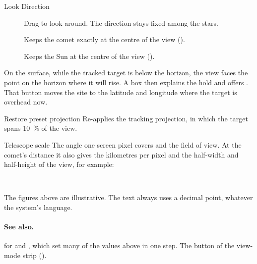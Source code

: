 \begin{uipanel}
\begin{uiproperty}[key=look-direction, id=OrientFree, type={radio buttons},
    range={\uilabel{Free look}, \uilabel{Comet tracking}, \uilabel{Sun tracking}},
    default={\uilabel{Free look}}, effect=camera, saved=file,
    help=Tabs_Settings_HelpObserverLookDirection]{Look Direction}
\begin{description}
  \item[] Drag to look around. The direction stays fixed among the stars.
  \item[] Keeps the comet exactly at the centre of the view
    ().
  \item[] Keeps the Sun at the centre of the view
    ().
\end{description}
On the surface, while the tracked target is below the horizon, the view faces the point on
the horizon where it will rise. A box then explains the hold and offers
. That button moves the site to the latitude and longitude
where the target is overhead now.
\end{uiproperty}

\begin{uiproperty}[key=restore-preset, id=RestorePresetButton, type={button}, effect=action,
    visible={enabled after the projection was changed away from the tracking preset}]
  {Restore preset projection}
Re-applies the tracking projection, in which the target spans \qty{10}{\percent} of the
view.
\end{uiproperty}

\begin{uiproperty}[key=scale, id=EarthObserverScaleText, type={read-only text},
    visible={Model view, once a scale is known}, help=Tabs_Settings_HelpObserverScale]
  {Telescope scale}
The angle one screen pixel covers and the field of view. At the comet's distance it also
gives the kilometres per pixel and the half-width and half-height of the view, for example:
\begin{center}\small
{}\\
\end{center}
The figures above are illustrative. The text always uses a decimal point, whatever the
system's language.
\end{uiproperty}

\paragraph{See also.}  for
 and , which set many of the values
above in one step. The  button of the view-mode strip ().

\end{uipanel}
